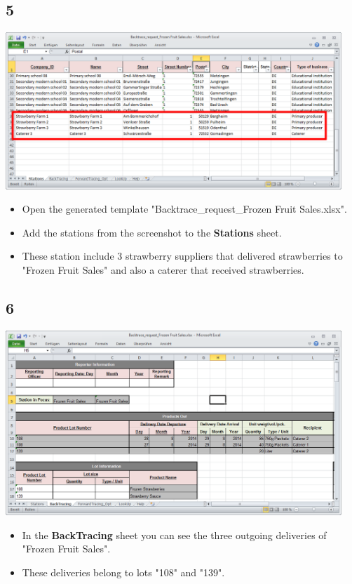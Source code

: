 \documentclass{beamer}
\begin{document}
\subsection{5}
\begin{frame}
	\begin{center}
  		\includegraphics[width=0.95\textwidth]{5.png}
	\end{center}
	\begin{itemize}
		\item Open the generated template "Backtrace\_request\_Frozen Fruit Sales.xlsx".
		\item Add the stations from the screenshot to the \textbf{Stations} sheet.
		\item These station include 3 strawberry suppliers that delivered strawberries to "Frozen Fruit Sales" and also a caterer that received strawberries.
	\end{itemize}
\end{frame}

\subsection{6}
\begin{frame}
	\begin{center}
  		\includegraphics[width=0.95\textwidth]{6.png}
	\end{center}
	\begin{itemize}
		\item In the \textbf{BackTracing} sheet you can see the three outgoing deliveries of "Frozen Fruit Sales".
		\item These deliveries belong to lots "108" and "139".
	\end{itemize}
\end{frame}
\end{document}
